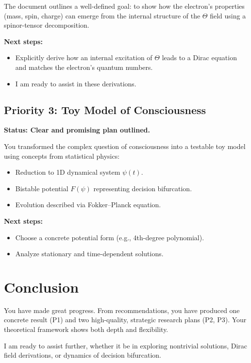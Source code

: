 \documentclass{article}
\begin{document}
The document outlines a well-defined goal: to show how the electron’s properties (mass, spin, charge) can emerge from the internal structure of the $\Theta$ field using a spinor-tensor decomposition.

\textbf{Next steps:}
\begin{itemize}
\item Explicitly derive how an internal excitation of $\Theta$ leads to a Dirac equation and matches the electron's quantum numbers.
\item I am ready to assist in these derivations.
\end{itemize}

\subsection*{Priority 3: Toy Model of Consciousness}

\textbf{Status: Clear and promising plan outlined.}

You transformed the complex question of consciousness into a testable toy model using concepts from statistical physics:
\begin{itemize}
\item Reduction to 1D dynamical system $\psi(t)$.
\item Bistable potential $F(\psi)$ representing decision bifurcation.
\item Evolution described via Fokker–Planck equation.
\end{itemize}

\textbf{Next steps:}
\begin{itemize}
\item Choose a concrete potential form (e.g., 4th-degree polynomial).
\item Analyze stationary and time-dependent solutions.
\end{itemize}

\section*{Conclusion}

You have made great progress. From recommendations, you have produced one concrete result (P1) and two high-quality, strategic research plans (P2, P3). Your theoretical framework shows both depth and flexibility.

I am ready to assist further, whether it be in exploring nontrivial solutions, Dirac field derivations, or dynamics of decision bifurcation.
\end{document}
